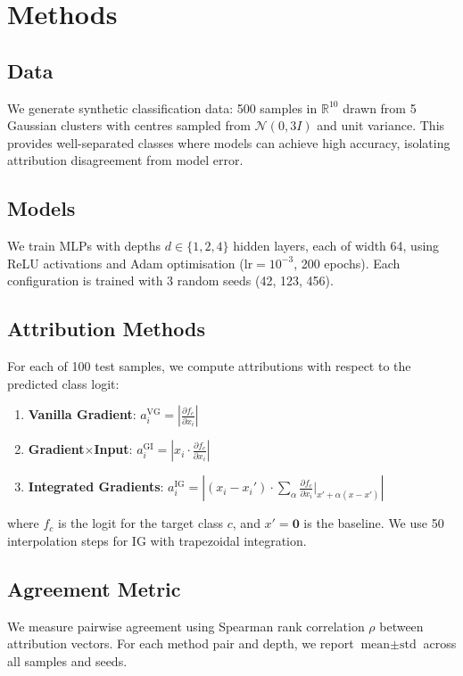 \documentclass[11pt,a4paper]{article}
\begin{document}
\section{Methods}

\subsection{Data}
We generate synthetic classification data: 500 samples in $\mathbb{R}^{10}$ drawn from 5 Gaussian clusters with centres sampled from $\mathcal{N}(0, 3I)$ and unit variance. This provides well-separated classes where models can achieve high accuracy, isolating attribution disagreement from model error.

\subsection{Models}
We train MLPs with depths $d \in \{1, 2, 4\}$ hidden layers, each of width 64, using ReLU activations and Adam optimisation ($\text{lr}=10^{-3}$, 200 epochs). Each configuration is trained with 3 random seeds (42, 123, 456).

\subsection{Attribution Methods}
For each of 100 test samples, we compute attributions with respect to the predicted class logit:

\begin{enumerate}
    \item \textbf{Vanilla Gradient}: $a_i^{\text{VG}} = \left|\frac{\partial f_c}{\partial x_i}\right|$
    \item \textbf{Gradient$\times$Input}: $a_i^{\text{GI}} = \left|x_i \cdot \frac{\partial f_c}{\partial x_i}\right|$
    \item \textbf{Integrated Gradients}: $a_i^{\text{IG}} = \left|(x_i - x_i') \cdot \sum_{\alpha} \frac{\partial f_c}{\partial x_i}\bigg|_{x' + \alpha(x-x')}\right|$
\end{enumerate}

where $f_c$ is the logit for the target class $c$, and $x' = \mathbf{0}$ is the baseline. We use 50 interpolation steps for IG with trapezoidal integration.

\subsection{Agreement Metric}
We measure pairwise agreement using Spearman rank correlation $\rho$ between attribution vectors. For each method pair and depth, we report $\text{mean} \pm \text{std}$ across all samples and seeds.
\end{document}
